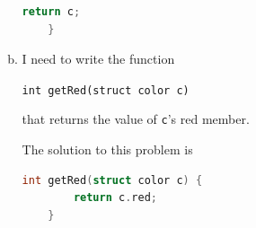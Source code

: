 \documentclass[12pt]{article}
\begin{document}
\begin{enumerate}[1.]
\begin{enumerate}[a)]
\begin{lstlisting}[language=c]
        return c;
    }
\end{lstlisting}

        \item

        I need to write the function

        \bigskip

        \texttt{int getRed(struct color c)}

        \bigskip

        that returns the value of \texttt{c}'s red member.

        \bigskip

        The solution to this problem is

\begin{lstlisting}[language=c]
    int getRed(struct color c) {
        return c.red;
    }
\end{lstlisting}


    \end{enumerate}

\end{enumerate}
\end{document}

